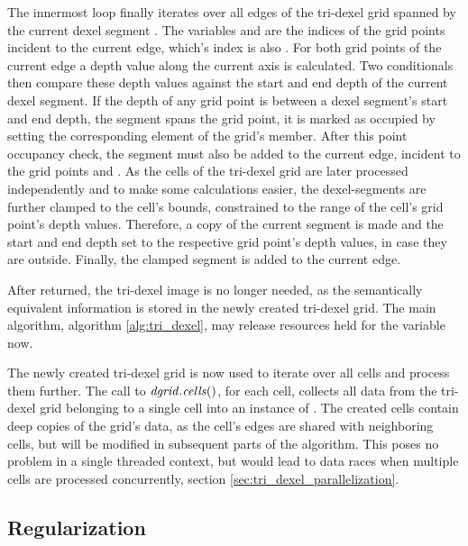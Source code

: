 The innermost loop finally iterates over all edges of the tri-dexel grid spanned by the current dexel segment .
The variables  and  are the indices of the grid points incident to the current edge, which's index is also .
For both grid points of the current edge a depth value along the current axis is calculated.
Two conditionals then compare these depth values against the start and end depth of the current dexel segment.
If the depth of any grid point is between a dexel segment's start and end depth, \ie the segment spans the grid point, it is marked as occupied by setting the corresponding element of the grid's  member.
After this point occupancy check, the segment must also be added to the current edge, incident to the grid points  and .
As the cells of the tri-dexel grid are later processed independently and to make some calculations easier, the dexel-segments are further clamped to the cell's bounds, \ie constrained to the range of the cell's grid point's depth values.
Therefore, a copy of the current segment is made and the start and end depth set to the respective grid point's depth values, in case they are outside.
Finally, the clamped segment is added to the current edge.

After  returned, the tri-dexel image is no longer needed, as the semantically equivalent information is stored in the newly created tri-dexel grid.
The main algorithm, algorithm \ref{alg:tri_dexel}, may release resources held for the  variable now.

The newly created tri-dexel grid  is now used to iterate over all cells and process them further.
The call to $\mathit{dgrid}.\mathit{cells}()$, for each cell, collects all data from the tri-dexel grid belonging to a single cell into an instance of .
The created cells contain deep copies of the grid's data, as the cell's edges are shared with neighboring cells, but will be modified in subsequent parts of the algorithm.
This poses no problem in a single threaded context, but would lead to data races when multiple cells are processed concurrently, \cf section \ref{sec:tri_dexel_parallelization}.


\subsection{Regularization}
\label{sec:tri_dexel_regularization}

